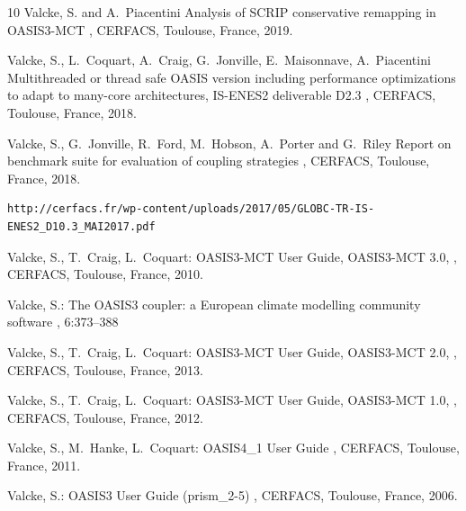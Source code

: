 \begin{thebibliography}{10}
Valcke, S. and A.~Piacentini
\newblock Analysis of SCRIP conservative remapping in OASIS3-MCT
,
\newblock CERFACS, Toulouse, France, 2019.

Valcke, S., L.~Coquart, A.~Craig, G.~Jonville, E.~Maisonnave, A.~Piacentini
\newblock Multithreaded or thread safe OASIS version including performance optimizations to adapt to many-core architectures, IS-ENES2 deliverable D2.3
,
\newblock CERFACS, Toulouse, France, 2018.

Valcke, S., G.~Jonville, R.~Ford, M.~Hobson, A.~Porter and G.~Riley
\newblock Report on benchmark suite for evaluation of coupling strategies
,
\newblock CERFACS, Toulouse, France, 2018.
\newblock  \begin{verbatim}http://cerfacs.fr/wp-content/uploads/2017/05/GLOBC-TR-IS-ENES2_D10.3_MAI2017.pdf\end{verbatim}

Valcke, S., T.~Craig, L.~Coquart:
\newblock OASIS3-MCT User Guide, OASIS3-MCT 3.0,
,
\newblock CERFACS, Toulouse, France, 2010.

Valcke, S.:
\newblock The OASIS3 coupler: a European climate modelling community software
, 6:373--388

Valcke, S., T.~Craig, L.~Coquart:
\newblock OASIS3-MCT User Guide, OASIS3-MCT 2.0,
,
\newblock CERFACS, Toulouse, France, 2013.

Valcke, S., T.~Craig, L.~Coquart:
\newblock OASIS3-MCT User Guide, OASIS3-MCT 1.0,
,
\newblock CERFACS, Toulouse, France, 2012.

Valcke, S., M.~Hanke, L.~Coquart:
\newblock OASIS4\_1 User Guide
,
\newblock CERFACS, Toulouse, France, 2011.

Valcke, S.:
\newblock OASIS3 User Guide (prism\_2-5)
,
\newblock CERFACS, Toulouse, France, 2006.


\end{thebibliography}
